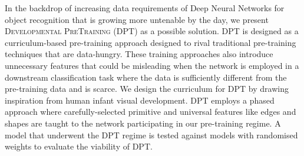 In the backdrop of increasing data requirements of Deep Neural Networks for object recognition that is growing more untenable by the day, we present \textsc{Developmental PreTraining} (DPT) as a possible solution. DPT is designed as a curriculum-based pre-training approach designed to rival traditional pre-training techniques that are data-hungry. These training approaches also introduce unnecessary features that could be misleading when the network is employed in a downstream classification task where the data is sufficiently different from the pre-training data and is scarce. We design the curriculum for DPT by drawing inspiration from human infant visual development. DPT employs a phased approach where carefully-selected primitive and universal features like edges and shapes are taught to the network participating in our pre-training regime. A model that underwent the DPT regime is tested against models with randomised weights to evaluate the viability of DPT.